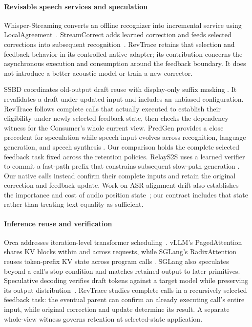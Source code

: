 \paragraph{Revisable speech services and speculation}
Whisper-Streaming converts an offline recognizer into incremental service
using LocalAgreement~\cite{machacek2023whisperstreaming}. StreamCorrect
adds learned correction and feeds selected corrections into subsequent
recognition~\cite{vu2026streamcorrect}. RevTrace retains that selection and
feedback behavior in its controlled native adapter; its contribution
concerns the asynchronous execution and consumption around the feedback
boundary. It does not introduce a better acoustic model or train a new
corrector.

SSBD coordinates old-output draft reuse with display-only suffix masking
\cite{zeng2026ssbd}. It revalidates a draft under updated input and includes
an unbiased configuration. RevTrace follows complete calls that actually
executed to establish their eligibility under newly selected feedback state,
then checks the dependency witness for the Consumer's whole current view.
PredGen provides a close precedent for speculation while speech input
evolves across recognition, language generation, and speech synthesis
\cite{li2025predgen}. Our comparison holds the complete selected feedback
task fixed across the retention policies. RelayS2S uses a learned verifier to commit a fast-path
prefix that constrains subsequent slow-path generation
\cite{mai2026relays2s}. Our native calls instead confirm their complete
inputs and retain the original correction and feedback update. Work on
ASR alignment drift also establishes the importance and cost of audio
position state~\cite{wang2026alignmentdrift}; our contract includes that
state rather than treating text equality as sufficient.

\paragraph{Inference reuse and verification}
Orca addresses iteration-level transformer scheduling~\cite{yu2022orca}.
vLLM's PagedAttention shares KV blocks within and across requests, while
SGLang's RadixAttention reuses token-prefix KV state across program calls
\cite{kwon2023pagedattention,zheng2024sglang}. SGLang also speculates beyond
a call's stop condition and matches retained output to later primitives.
Speculative decoding verifies draft tokens against a target model while
preserving its output distribution~\cite{leviathan2023speculative}.
RevTrace studies complete calls in a recursively selected feedback task:
the eventual parent can confirm an already executing call's entire input,
while original correction and update determine its result. A separate
whole-view witness governs retention at selected-state application.

